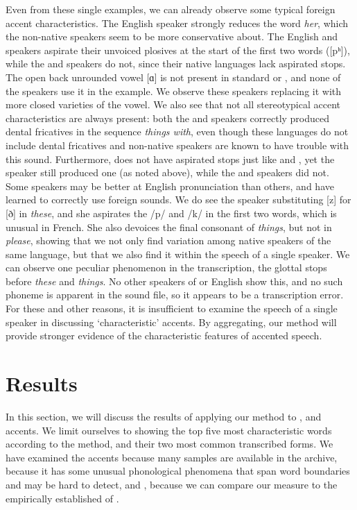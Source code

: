 \documentclass[output=paper]{LSP/langsci}
\begin{document}
Even from these single examples, we can already observe some typical foreign accent characteristics. The English speaker strongly reduces the word \textit{her}, which the non-native speakers seem to be more conservative about. The English and  speakers aspirate their unvoiced plosives at the start of the first two words ([pʰ]), while the  and  speakers do not, since their native languages lack aspirated stops. The open back unrounded vowel [ɑ] is not present in standard  or , and none of the speakers use it in the example. We observe these speakers replacing it with more closed varieties of the vowel. We also see that not all stereotypical accent characteristics are always present: both the  and  speakers correctly produced dental fricatives in the sequence \textit{things with}, even though these languages do not include dental fricatives and non-native speakers are known to have trouble with this sound. Furthermore,  does not have aspirated stops just like  and , yet the  speaker still produced one (as noted above), while the  and  speakers did not. Some speakers may be better at English pronunciation than others, and have learned to correctly use foreign sounds. We do see the  speaker substituting [z] for [ð] in \textit{these}, and she aspirates the /p/ and /k/ in the first two words, which is unusual in French. She also devoices the final consonant of \textit{things}, but not in \textit{please}, showing that we not only find variation among native speakers of the same language, but that we also find it within the speech of a single speaker. We can observe one peculiar phenomenon in the  transcription, the glottal stops before \textit{these} and \textit{things}. No other speakers of  or English show this, and no such phoneme is apparent in the sound file, so it appears to be a transcription error. For these and other reasons, it is insufficient to examine the speech of a single speaker in discussing `characteristic' accents. By aggregating, our method will provide stronger evidence of the characteristic features of accented speech.

\section{Results}
\label{s:results}

In this section, we will discuss the results of applying our method to ,  and  accents. We limit ourselves to showing the top five most characteristic words according to the method, and their two most common transcribed forms. We have examined the  accents because many samples are available in the archive,  because it has some unusual phonological phenomena that span word boundaries and may be hard to detect, and , because we can compare our measure to the empirically established  of \citet{van_den_doel_evaluation_2006}.
\end{document}
